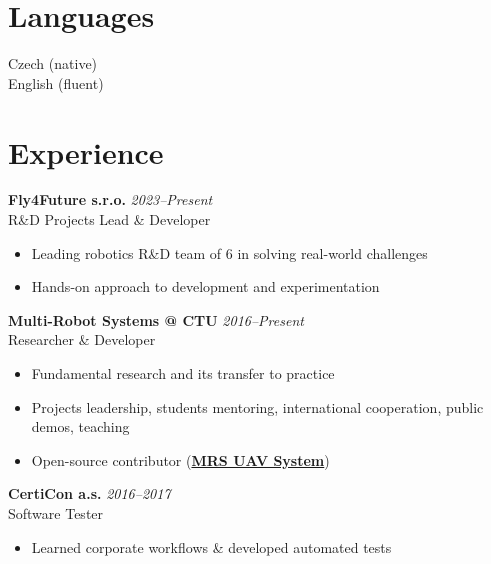 \documentclass[12pt,a4paper]{article}
\newcommand\Colorhreff[3][reff]{\href{#2}{\color{#1}#3}}
\newcommand{\bluesquare}{\raisebox{0.5ex}{\textcolor{primary}{\rule{0.5ex}{0.5ex}}}}
\begin{document}
\begin{paracol}{2}
\vspace{0.6em}
\section*{Languages}
Czech (native)\\
English (fluent)

\switchcolumn

\color{primary}

\vspace{-0.5cm}
\section*{Experience}

\textbf{Fly4Future s.r.o.} \hfill \textit{2023–Present} \\
R\&D Projects Lead \& Developer
\begin{itemize}[label=\bluesquare, left=0.5em]
  \item Leading robotics R\&D team of 6 in solving real-world challenges
  \item Hands-on approach to development and experimentation
\end{itemize}

\vspace{0.35cm}
\noindent
\textbf{Multi-Robot Systems @ CTU} \hfill \textit{2016–Present} \\
Researcher \& Developer
\begin{itemize}[label=\bluesquare, left=0.5em]
  \item Fundamental research and its transfer to practice
  \item Projects leadership, students mentoring, international cooperation, public demos, teaching
  \item Open-source contributor (\Colorhreff{https://github.com/ctu-mrs/mrs_uav_system}{\textbf{MRS UAV System}})
\end{itemize}

\vspace{0.35cm}
\noindent
\textbf{CertiCon a.s.} \hfill \textit{2016–2017} \\
Software Tester
\begin{itemize}[label=\bluesquare, left=0.5em]
  \item Learned corporate workflows \& developed automated tests
\end{itemize}


\end{paracol}
\end{document}
